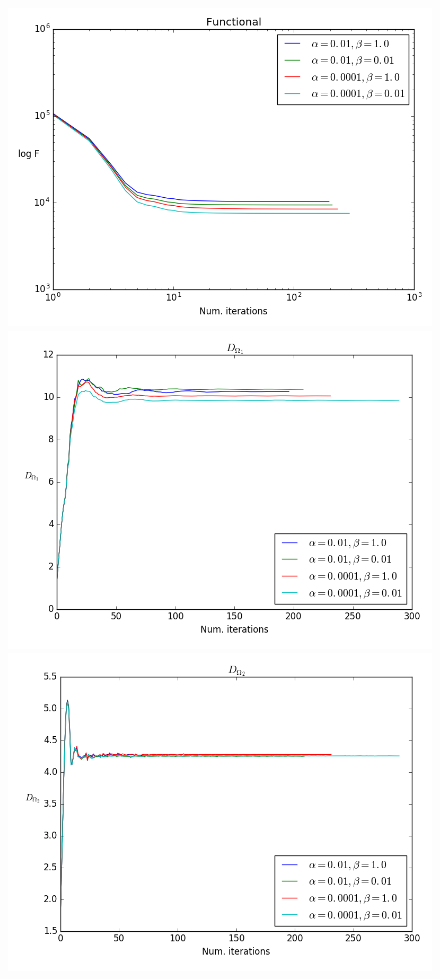 \documentclass[11pt,a4paper]{article}
\begin{document}
\begin{figure}
\centering
\includegraphics[scale=0.2]{convergence_0}  
\includegraphics[scale=0.2]{convergence_1}  
\includegraphics[scale=0.2]{convergence_2}  

\end{figure}
\end{document}
